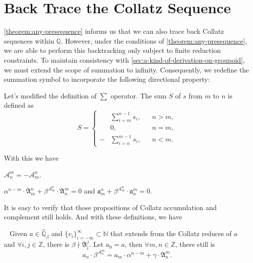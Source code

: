 \section{Back Trace the Collatz Sequence}\label{sec:back-trace-the-collatz-sequence}
\cref{theorem:any-presequence} informs us that we can also trace back Collatz sequences within $\mathbb{Q}$.
However, under the conditions of \cref{theorem:any-presequence}, we are able to perform this backtracking only subject to finite reduction constraints.
To maintain consistency with \cref{sec:a-kind-of-derivation-on-groupoid}, we must extend the scope of summation to infinity. Consequently, we redefine the summation symbol to incorporate the following directional property:
\begin{definition}
    Let's modified the definition of $\sum$ operator. The sum $S$ of $s$ from $m$ to $n$ is defined as
    \[ S = \left\{\begin{aligned}
    &\sum_{i=m}^{n-1}s_i, &&n > m, \\
    &0, &&n = m, \\
    -&\sum_{i=n}^{m-1}s_i, &&n < m.
\end{aligned}\right. \]
\end{definition}
With this we have
\begin{proposition}
    $\mathcal{A}_{n}^{m} = -\mathcal{A}_{m}^{n}$.
\end{proposition}
\begin{proposition}
    $\alpha^{n-m} \cdot \mathfrak{A}_{m}^{n} + \beta^{\mathcal{A}_m^n} \cdot \mathfrak{A}_{n}^{m} = 0$ and $\mathfrak{a}_{m}^{n} + \beta^{\mathcal{A}_m^n} \cdot \mathfrak{a}_{n}^{m} = 0$.
\end{proposition}
It is easy to verify that those propositions of Collatz accumulation and complement still holds.
And with these definitions, we have
\begin{theorem}~\label{theorem:final-inductive-formula}
Given $a \in \widehat{\mathbb{Q}}_{{\beta}}$ and $\{v_{i}\}_{i=-\infty}^{\infty} \subset \mathbb{N}$ that extends from the Collatz reduces of $a$ and $\forall i, j \in \mathbb{Z}$, there is $\beta \nmid \mathfrak{A}_{i}^{j}$.
Let $a_0 = a$, then $\forall m, n \in \mathbb{Z}$, there still is
\[ a_n \cdot \beta^{\mathcal{A}_{n}^{m}} = a_m \cdot\alpha^{n-m} + \gamma\cdot\mathfrak{A}_{n}^{m}. \]
\end{theorem}

